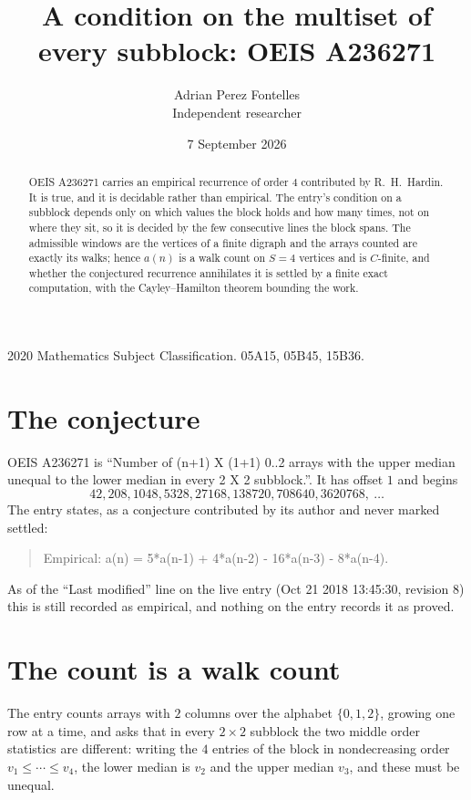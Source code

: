 \documentclass[11pt,a4paper]{article}
\title{A condition on the multiset of every subblock: OEIS A236271}
\author{Adrian Perez Fontelles\\ \small Independent researcher}
\date{7 September 2026}
\theoremstyle{plain}
\theoremstyle{definition}
\begin{document}
\maketitle

\begin{abstract}
OEIS A236271 carries an empirical recurrence of order $4$ contributed by R.~H.~Hardin. It is
true, and it is decidable rather than empirical. The entry's condition on a subblock depends
only on which values the block holds and how many times, not on where they sit, so it is
decided by the few consecutive lines the block spans. The admissible windows are the vertices
of a finite digraph and the arrays counted are exactly its walks; hence $a(n)$ is a walk count
on $S=4$ vertices and is $C$-finite, and whether the conjectured recurrence annihilates it
is settled by a finite exact computation, with the Cayley--Hamilton theorem bounding the
work.
\end{abstract}

\noindent\small 2020 Mathematics Subject Classification. 05A15, 05B45, 15B36.\normalsize

\section{The conjecture}

OEIS A236271 is ``Number of (n+1) X (1+1) 0..2 arrays with the upper median unequal to the lower median in every 2 X 2 subblock.''. It has offset $1$ and begins
\[
42, 208, 1048, 5328, 27168, 138720, 708640, 3620768,\ \dots
\]
The entry states, as a conjecture contributed by its author and never marked settled:
\begin{quote}
Empirical: a(n) = 5*a(n-1) + 4*a(n-2) - 16*a(n-3) - 8*a(n-4).
\end{quote}
As of the ``Last modified'' line on the live entry (Oct 21 2018 13:45:30, revision 8) this is still
recorded as empirical, and nothing on the entry records it as proved.

\section{The count is a walk count}

The entry counts arrays with $2$ columns over the alphabet $\{0,1,2\}$, growing one row at a time, and asks that in every $2\times2$ subblock the two middle order statistics are different: writing the $4$ entries of the block in nondecreasing order $v_1\le\cdots\le v_{4}$, the lower median is $v_{2}$ and the upper median $v_{3}$, and these must be unequal.
\end{document}
